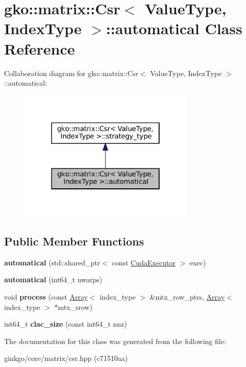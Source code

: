 \hypertarget{classgko_1_1matrix_1_1Csr_1_1automatical}{}\section{gko\+:\+:matrix\+:\+:Csr$<$ Value\+Type, Index\+Type $>$\+:\+:automatical Class Reference}
\label{classgko_1_1matrix_1_1Csr_1_1automatical}


Collaboration diagram for gko\+:\+:matrix\+:\+:Csr$<$ Value\+Type, Index\+Type $>$\+:\+:automatical\+:
\nopagebreak
\begin{figure}[H]
\begin{center}
\leavevmode
\includegraphics[width=238pt]{classgko_1_1matrix_1_1Csr_1_1automatical__coll__graph}
\end{center}
\end{figure}
\subsection*{Public Member Functions}
\begin{DoxyCompactItemize}
\item 
\mbox{\label{classgko_1_1matrix_1_1Csr_1_1automatical_a5e3cff9dc55b22b01ddf3db31731b267}} 
{\bfseries automatical} (std\+::shared\+\_\+ptr$<$ const \hyperlink{classgko_1_1CudaExecutor}{Cuda\+Executor} $>$ exec)
\item 
\mbox{\label{classgko_1_1matrix_1_1Csr_1_1automatical_af69e7b41ae7edd4d89c9a41763eb8ed9}} 
{\bfseries automatical} (int64\+\_\+t nwarps)
\item 
\mbox{\label{classgko_1_1matrix_1_1Csr_1_1automatical_adfc6b9f6bc311a1dedb758009a541741}} 
void {\bfseries process} (const \hyperlink{classgko_1_1Array}{Array}$<$ index\+\_\+type $>$ \&mtx\+\_\+row\+\_\+ptrs, \hyperlink{classgko_1_1Array}{Array}$<$ index\+\_\+type $>$ $\ast$mtx\+\_\+srow)
\item 
\mbox{\label{classgko_1_1matrix_1_1Csr_1_1automatical_af4ea78545a4fbdacfb75951fe3d0a701}} 
int64\+\_\+t {\bfseries clac\+\_\+size} (const int64\+\_\+t nnz)
\end{DoxyCompactItemize}


The documentation for this class was generated from the following file\+:\begin{DoxyCompactItemize}
\item 
ginkgo/core/matrix/csr.\+hpp (c71510aa)\end{DoxyCompactItemize}
